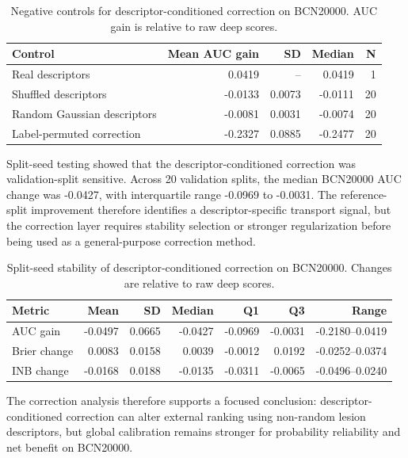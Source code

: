 \documentclass[preprint,12pt]{elsarticle}
\begin{document}
\begin{table}[htbp]
\centering
\caption{Negative controls for descriptor-conditioned correction on BCN20000. AUC gain is relative to raw deep scores.}
\label{tab:negative_controls}
\begin{tabular}{lrrrr}
\toprule
Control & Mean AUC gain & SD & Median & N \\
\midrule
Real descriptors & 0.0419 & -- & 0.0419 & 1 \\
Shuffled descriptors & -0.0133 & 0.0073 & -0.0111 & 20 \\
Random Gaussian descriptors & -0.0081 & 0.0031 & -0.0074 & 20 \\
Label-permuted correction & -0.2327 & 0.0885 & -0.2477 & 20 \\
\bottomrule
\end{tabular}
\end{table}

Split-seed testing showed that the descriptor-conditioned correction was validation-split sensitive. Across 20 validation splits, the median BCN20000 AUC change was -0.0427, with interquartile range -0.0969 to -0.0031. The reference-split improvement therefore identifies a descriptor-specific transport signal, but the correction layer requires stability selection or stronger regularization before being used as a general-purpose correction method.

\begin{table}[htbp]
\centering
\caption{Split-seed stability of descriptor-conditioned correction on BCN20000. Changes are relative to raw deep scores.}
\label{tab:split_stability}
\begin{tabular}{lrrrrrr}
\toprule
Metric & Mean & SD & Median & Q1 & Q3 & Range \\
\midrule
AUC gain & -0.0497 & 0.0665 & -0.0427 & -0.0969 & -0.0031 & -0.2180--0.0419 \\
Brier change & 0.0083 & 0.0158 & 0.0039 & -0.0012 & 0.0192 & -0.0252--0.0374 \\
INB change & -0.0168 & 0.0188 & -0.0135 & -0.0311 & -0.0065 & -0.0496--0.0240 \\
\bottomrule
\end{tabular}
\end{table}

The correction analysis therefore supports a focused conclusion: descriptor-conditioned correction can alter external ranking using non-random lesion descriptors, but global calibration remains stronger for probability reliability and net benefit on BCN20000.
\end{document}
